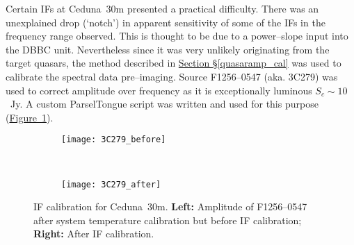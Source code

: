 			Certain IFs at Ceduna~30m presented a practical difficulty. There was an unexplained drop (`notch') in apparent sensitivity of some of the IFs in the frequency range observed. This is thought to be due to a power--slope input into the DBBC unit. Nevertheless since it was very unlikely originating from the target quasars, the method described in \hyperref[quasaramp_cal]{Section \S\ref*{quasaramp_cal}} was used to calibrate the spectral data pre--imaging. Source F1256--0547 (aka. 3C279) was used to correct amplitude over frequency as it is exceptionally luminous $S_c\sim10$~Jy. A custom ParselTongue script was written and used for this purpose (\hyperref[fig:cedunaIFs]{Figure~\ref*{fig:cedunaIFs}}).
			\begin{figure}[h]
				\centering
				\begin{subfigure}[t]{0.475\textwidth}
					\centering
					\texttt{[image: 3C279\_before]}
				\end{subfigure}
				~
				\begin{subfigure}[t]{0.475\textwidth}
					\centering
					\texttt{[image: 3C279\_after]} 
				\end{subfigure}
				\caption[Calibrating Ceduna IFs with 3C279]{IF calibration for Ceduna~30m. \textbf{Left:} Amplitude of F1256--0547 after system temperature calibration but before IF calibration; \textbf{Right:} After IF calibration.} \label{fig:cedunaIFs}
     		\end{figure}
			
